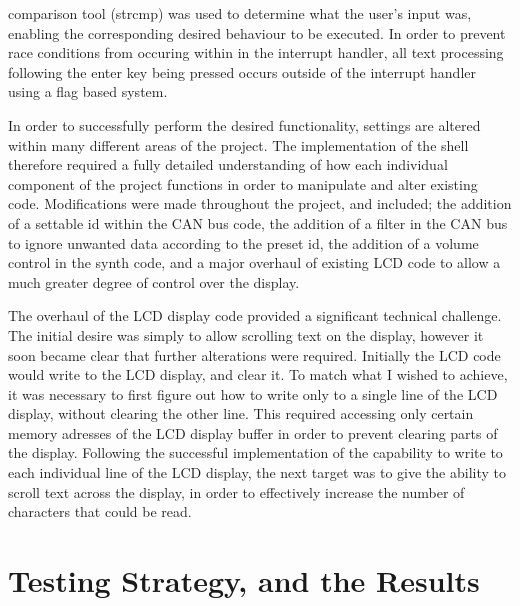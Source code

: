 comparison tool (strcmp) was used to determine what the user's input was, 
enabling the corresponding desired behaviour to be executed. In order to 
prevent race conditions from occuring within in the interrupt handler, all text 
processing following the enter key being pressed occurs outside of the interrupt 
handler using a flag based system.
\par\bigskip\noindent
In order to successfully perform the desired functionality, settings are altered 
within many different areas of the project. The implementation of the shell 
therefore required a fully detailed understanding of how each individual 
component of the project functions in order to manipulate and alter existing 
code. Modifications were made throughout the project, and included; the addition 
of a settable id within the CAN bus code, the addition of a filter in the CAN 
bus to ignore unwanted data according to the preset id, the addition of a 
volume control in the synth code, and a major overhaul of existing LCD code to 
allow a much greater degree of control over the display. 
\par\bigskip\noindent
The overhaul of the LCD display code provided a significant technical challenge. 
The initial desire was simply to allow scrolling text on the display, however 
it soon became clear that further alterations were required. Initially the LCD 
code would write to the LCD display, and clear it. To match what I wished to 
achieve, it was necessary to first figure out how to write only to a single 
line of the LCD display, without clearing the other line. This required 
accessing only certain memory adresses of the LCD display buffer in order to 
prevent clearing parts of the display. Following the successful implementation 
of the capability to write to each individual line of the LCD display, the next 
target was to give the ability to scroll text across the display, in order to 
effectively increase the number of characters that could be read. 


\section{Testing Strategy, and the Results}
